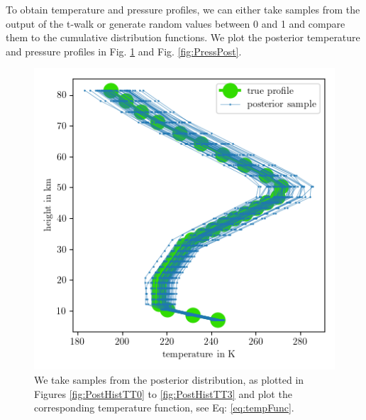 \clearpage
To obtain temperature and pressure profiles, we can either take samples from the output of the t-walk or generate random values between 0 and 1 and compare them to the cumulative distribution functions.
We plot the posterior temperature and pressure profiles in Fig. \ref{fig:TempPost} and Fig. \ref{fig:PressPost}.
\begin{figure}[ht!]
	\centering
	\includegraphics{TempPostMeanSigm.png} 
	\caption[Temperature posterior samples.]{We take samples from the posterior distribution, as plotted in Figures \ref{fig:PostHistTT0} to \ref{fig:PostHistTT3} and plot the corresponding temperature function, see Eq: \ref{eq:tempFunc}. }
	\label{fig:TempPost}
\end{figure}

